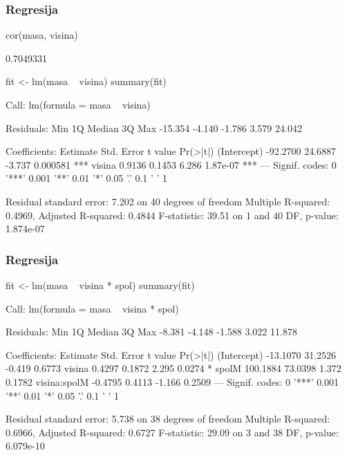 \begin{frame}[fragile]
\frametitle{Regresija}
\begin{Schunk}
\begin{Sinput}
  cor(masa, visina)
\end{Sinput}
\begin{Soutput}
[1] 0.7049331
\end{Soutput}
\begin{Sinput}
  fit <- lm(masa ~ visina)
  summary(fit)
\end{Sinput}
\begin{Soutput}
Call:
lm(formula = masa ~ visina)

Residuals:
    Min      1Q  Median      3Q     Max 
-15.354  -4.140  -1.786   3.579  24.042 

Coefficients:
            Estimate Std. Error t value Pr(>|t|)    
(Intercept) -92.2700    24.6887  -3.737 0.000581 ***
visina        0.9136     0.1453   6.286 1.87e-07 ***
---
Signif. codes:  0 '***' 0.001 '**' 0.01 '*' 0.05 '.' 0.1 ' ' 1 

Residual standard error: 7.202 on 40 degrees of freedom
Multiple R-squared: 0.4969,	Adjusted R-squared: 0.4844 
F-statistic: 39.51 on 1 and 40 DF,  p-value: 1.874e-07 
\end{Soutput}
\end{Schunk}
\end{frame}

\begin{frame}[fragile]
\frametitle{Regresija}
\begin{Schunk}
\begin{Sinput}
  fit <- lm(masa ~ visina * spol)
  summary(fit)
\end{Sinput}
\begin{Soutput}
Call:
lm(formula = masa ~ visina * spol)

Residuals:
   Min     1Q Median     3Q    Max 
-8.381 -4.148 -1.588  3.022 11.878 

Coefficients:
             Estimate Std. Error t value Pr(>|t|)  
(Intercept)  -13.1070    31.2526  -0.419   0.6773  
visina         0.4297     0.1872   2.295   0.0274 *
spolM        100.1884    73.0398   1.372   0.1782  
visina:spolM  -0.4795     0.4113  -1.166   0.2509  
---
Signif. codes:  0 '***' 0.001 '**' 0.01 '*' 0.05 '.' 0.1 ' ' 1 

Residual standard error: 5.738 on 38 degrees of freedom
Multiple R-squared: 0.6966,	Adjusted R-squared: 0.6727 
F-statistic: 29.09 on 3 and 38 DF,  p-value: 6.079e-10 
\end{Soutput}
\end{Schunk}
\end{frame}

